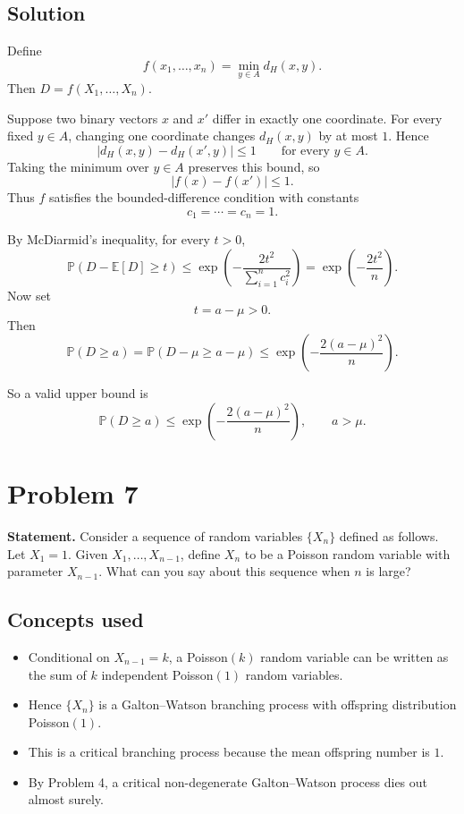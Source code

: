 \documentclass[11pt]{article}
\newcommand{\EE}{\mathbb{E}}
\newcommand{\PP}{\mathbb{P}}
\begin{document}
\subsection*{Solution}

Define
\[
f(x_1,\dots,x_n)=\min_{y\in A} d_H(x,y).
\]
Then $D=f(X_1,\dots,X_n)$.

Suppose two binary vectors $x$ and $x'$ differ in exactly one coordinate. For every fixed
$y\in A$, changing one coordinate changes $d_H(x,y)$ by at most $1$. Hence
\[
|d_H(x,y)-d_H(x',y)|\le 1
\qquad \text{for every } y\in A.
\]
Taking the minimum over $y\in A$ preserves this bound, so
\[
|f(x)-f(x')|\le 1.
\]
Thus $f$ satisfies the bounded-difference condition with constants
\[
c_1=\cdots=c_n=1.
\]

By McDiarmid's inequality, for every $t>0$,
\[
\PP(D-\EE[D]\ge t)\le \exp\!\left(-\frac{2t^2}{\sum_{i=1}^n c_i^2}\right)
=\exp\!\left(-\frac{2t^2}{n}\right).
\]
Now set
\[
t=a-\mu >0.
\]
Then
\[
\PP(D\ge a)=\PP(D-\mu\ge a-\mu)\le \exp\!\left(-\frac{2(a-\mu)^2}{n}\right).
\]

So a valid upper bound is
\[
\boxed{\PP(D\ge a)\le \exp\!\left(-\frac{2(a-\mu)^2}{n}\right), \qquad a>\mu.}
\]

\section*{Problem 7}

\textbf{Statement.} Consider a sequence of random variables $\{X_n\}$ defined as follows.
Let $X_1=1$. Given $X_1,\dots,X_{n-1}$, define $X_n$ to be a Poisson random variable with
parameter $X_{n-1}$. What can you say about this sequence when $n$ is large?

\subsection*{Concepts used}

\begin{itemize}
\item Conditional on $X_{n-1}=k$, a Poisson$(k)$ random variable can be written as the sum of
      $k$ independent Poisson$(1)$ random variables.
\item Hence $\{X_n\}$ is a Galton--Watson branching process with offspring distribution
      Poisson$(1)$.
\item This is a critical branching process because the mean offspring number is $1$.
\item By Problem 4, a critical non-degenerate Galton--Watson process dies out almost surely.
\end{itemize}
\end{document}
